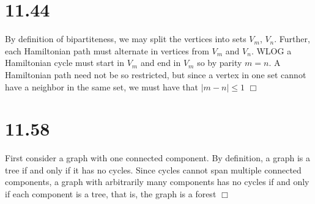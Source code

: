 \documentclass{article}
\begin{document}
\section*{11.44}
By definition of bipartiteness, we may split the vertices into sets $V_m$, $V_n$. Further, each Hamiltonian path must alternate in vertices from $V_m$ and $V_n$. WLOG a Hamiltonian cycle must start in $V_m$ and end in $V_m$ so by parity $m = n$. A Hamiltonian path need not be so restricted, but since a vertex in one set cannot have a neighbor in the same set, we must have that $|m - n| \leq 1$ $\Box$

\section*{11.58}
First consider a graph with one connected component. By definition, a graph is a tree if and only if it has no cycles. Since cycles cannot span multiple connected components, a graph with arbitrarily many components has no cycles if and only if each component is a tree, that is, the graph is a forest $\Box$
\end{document}
